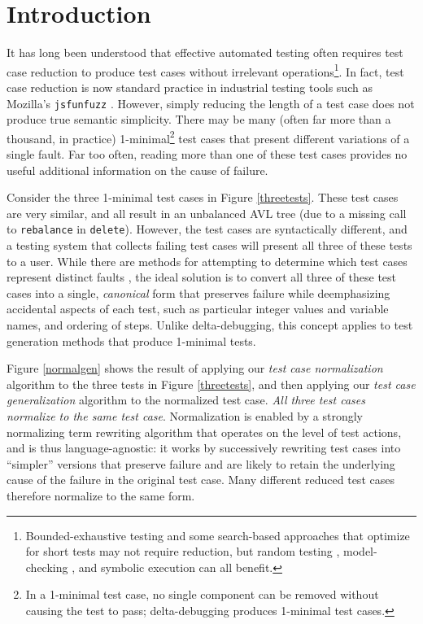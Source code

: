 \section{Introduction}

It has long been understood that effective automated testing often requires
test case reduction \cite{DD,MinUnit,TCminim,ICSEDiff} to produce test cases
without irrelevant operations\footnote{Bounded-exhaustive testing
  \cite{SoftBET} and some search-based approaches that
  optimize for short tests \cite{FA11} may not require reduction, but random
  testing \cite{RandFormal,HamletOnly}, model-checking
  \cite{Gastin04minimizationof}, and symbolic execution \cite{issta14}
  can all benefit.}.  In fact, test case reduction is
now standard practice in industrial testing tools such as Mozilla's
{\tt jsfunfuzz} \cite{jsfunfuzz,jsfunfuzz2,lithium}.  However, simply reducing the length of a test case
does not produce true semantic simplicity.  There may be many
(often far more than a thousand, in practice) 1-minimal\footnote{In a
  1-minimal test case, no single component can be removed without
  causing the test to pass; delta-debugging \cite{DD}
  produces 1-minimal test cases.} test cases
that present different variations of a single fault.  Far too often,
reading more than one of these test cases provides no useful
additional information on the cause of failure. 

Consider the three 1-minimal test cases in Figure
\ref{threetests}.  These test cases are very similar, and all result
in an unbalanced AVL tree (due to a missing call to {\tt rebalance} in
{\tt delete}).  However, the test cases are syntactically different,
and a testing system that collects failing test cases will present all
three of these tests to a user.  While there are methods for
attempting to determine which test cases represent distinct faults
\cite{PLDI13}, the ideal solution is to convert all three of these
test cases into a single, \emph{canonical} form that preserves failure
while deemphasizing accidental aspects of each test, such as
particular integer values and variable names, and ordering of steps.
Unlike delta-debugging, this concept applies to test generation
methods that produce 1-minimal tests.

Figure \ref{normalgen} shows the result of applying our \emph{test
  case normalization} algorithm to the three tests in Figure
\ref{threetests}, and then applying our \emph{test case
  generalization} algorithm to the normalized test case.  \emph{All
  three test cases normalize to the same test case}.  Normalization is
enabled by a strongly normalizing term rewriting algorithm \cite{term2,term1} that operates
on the level of test actions, and is thus language-agnostic:
it works by successively rewriting test cases into ``simpler''
versions that preserve failure and are likely to retain the
underlying cause of the failure in the original test case. Many
different reduced test cases therefore normalize to the same form.

